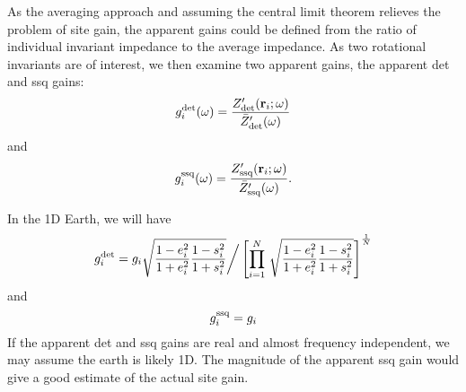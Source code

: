 
As the averaging approach and assuming the central limit theorem relieves the problem of site gain, the apparent gains could be defined from the ratio of individual invariant impedance to the average impedance.
As two rotational invariants are of interest, we then examine two apparent gains, 
the apparent det and ssq gains: 
\begin{equation}\label{eq:gdet_def}
	\gdeti\fxomega = \frac{\ZdetDistorted\fxriomega}{\ZdetDistortedMean\fxomega}
\end{equation}
and
\begin{equation}\label{eq:gssq_def}
	\gssqi\fxomega = \frac{\ZssqDistorted\fxriomega}{\ZssqDistortedMean\fxomega}.
\end{equation}

In the 1D Earth, we will have
\begin{equation}
	g^{\mathrm{det}}_i = g_i \sqrt{\frac{1-e_i^2}{1+e_i^2}\frac{1-s_i^2}{1+s_i^2}} \bigg/ \left[ \prod\limits_{i=1}^{N}\, \sqrt{\frac{1-e_i^2}{1+e_i^2} \frac{1-s_i^2}{1+s_i^2}} \right]^\frac{1}{N} 
\end{equation}
and
\begin{equation}
	g^{\mathrm{ssq}}_i = g_i 
\end{equation}
If the apparent det and ssq gains are real and almost frequency independent, we may assume the earth is likely 1D. The magnitude of the apparent ssq gain would give a good estimate of the actual site gain.


